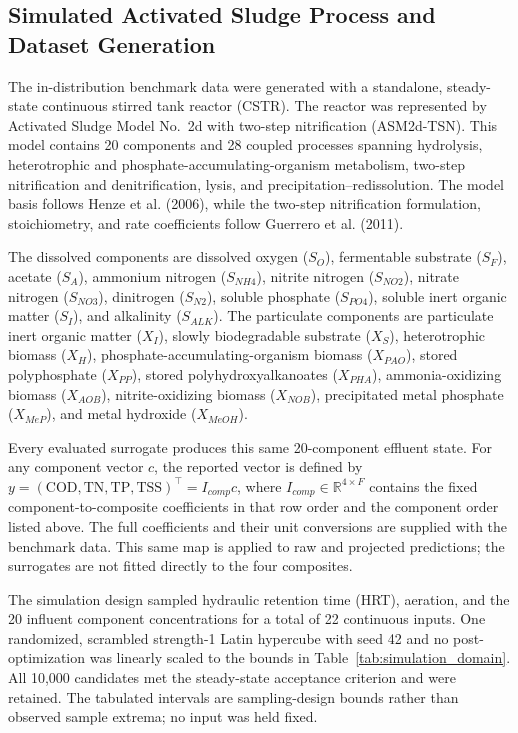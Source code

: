 \documentclass[a4paper,fleqn]{cas-sc}
\begin{document}
\subsection{Simulated Activated Sludge Process and Dataset Generation}

The in-distribution benchmark data were generated with a standalone, steady-state continuous stirred tank reactor (CSTR). The reactor was represented by Activated Sludge Model No.\ 2d with two-step nitrification (ASM2d-TSN). This model contains 20 components and 28 coupled processes spanning hydrolysis, heterotrophic and phosphate-accumulating-organism metabolism, two-step nitrification and denitrification, lysis, and precipitation--redissolution. The model basis follows Henze et al. (2006), while the two-step nitrification formulation, stoichiometry, and rate coefficients follow Guerrero et al. (2011).

The dissolved components are dissolved oxygen ($S_O$), fermentable substrate ($S_F$), acetate ($S_A$), ammonium nitrogen ($S_{NH4}$), nitrite nitrogen ($S_{NO2}$), nitrate nitrogen ($S_{NO3}$), dinitrogen ($S_{N2}$), soluble phosphate ($S_{PO4}$), soluble inert organic matter ($S_I$), and alkalinity ($S_{ALK}$). The particulate components are particulate inert organic matter ($X_I$), slowly biodegradable substrate ($X_S$), heterotrophic biomass ($X_H$), phosphate-accumulating-organism biomass ($X_{PAO}$), stored polyphosphate ($X_{PP}$), stored polyhydroxyalkanoates ($X_{PHA}$), ammonia-oxidizing biomass ($X_{AOB}$), nitrite-oxidizing biomass ($X_{NOB}$), precipitated metal phosphate ($X_{MeP}$), and metal hydroxide ($X_{MeOH}$).

Every evaluated surrogate produces this same 20-component effluent state. For any component vector $c$, the reported vector is defined by
$y=(\mathrm{COD},\mathrm{TN},\mathrm{TP},\mathrm{TSS})^\top=I_{comp}c$,
where $I_{comp}\in\mathbb{R}^{4\times F}$ contains the fixed component-to-composite coefficients in that row order and the component order listed above. The full coefficients and their unit conversions are supplied with the benchmark data. This same map is applied to raw and projected predictions; the surrogates are not fitted directly to the four composites.

The simulation design sampled hydraulic retention time (HRT), aeration, and the 20 influent component concentrations for a total of 22 continuous inputs. One randomized, scrambled strength-1 Latin hypercube with seed 42 and no post-optimization was linearly scaled to the bounds in Table~\ref{tab:simulation_domain}. All 10,000 candidates met the steady-state acceptance criterion and were retained. The tabulated intervals are sampling-design bounds rather than observed sample extrema; no input was held fixed.
\end{document}
